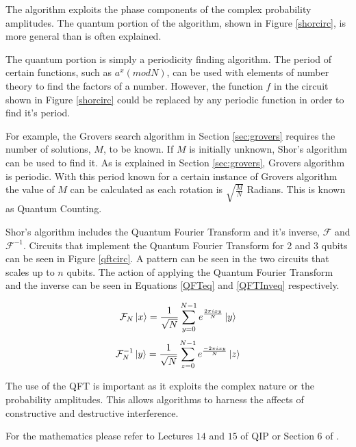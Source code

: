 The algorithm exploits the phase components of the complex probability amplitudes.
The quantum portion of the algorithm, shown in Figure \ref{shorcirc}, is more general than is often explained.

The quantum portion is simply a periodicity finding algorithm.
The period of certain functions, such as $a^x(mod N)$, can be used with elements of number theory to find the factors of a number.
However, the function $f$ in the circuit shown in Figure \ref{shorcirc} could be replaced by any periodic function in order to find it's period.

For example, the Grovers search algorithm in Section \ref{sec:grovers} requires the number of solutions, $M$, to be known.
If $M$ is initially unknown, Shor's algorithm can be used to find it.
As is explained in Section \ref{sec:grovers}, Grovers algorithm is periodic.
With this period known for a certain instance of Grovers algorithm the value of $M$ can be calculated as each rotation is $\sqrt{\frac{M}{N}}$ Radians.
This is known as Quantum Counting\cite{Brassard:1998vj}.

Shor's algorithm includes the Quantum Fourier Transform and it's inverse, $\mathcal{F}$ and $\mathcal{F}^{-1}$.
Circuits that implement the Quantum Fourier Transform for 2 and 3 qubits can be seen in Figure \ref{qftcirc}.
A pattern can be seen in the two circuits that scales up to $n$ qubits.
The action of applying the Quantum Fourier Transform and the inverse can be seen in Equations \ref{QFTeq} and \ref{QFTInveq} respectively.

\begin{equation}
 \mathcal{F}_N\left\vert{x}\right\rangle=\frac{1}{\sqrt{N}}\sum_{y=0}^{N-1}e^{\frac{2\pi{i}xy}{N}}\left\vert{y}\right\rangle
\label{QFTeq}
\end{equation}
\begin{equation}
 \mathcal{F}^{-1}_N\left\vert{y}\right\rangle=\frac{1}{\sqrt{N}}\sum_{z=0}^{N-1}e^{\frac{-2\pi{i}xy}{N}}\left\vert{z}\right\rangle
\label{QFTInveq}
\end{equation}

The use of the QFT is important as it exploits the complex nature or the probability amplitudes.
This allows algorithms to harness the affects of constructive and destructive interference.

For the mathematics please refer to Lectures $14$ and $15$ of QIP\cite{QIPLect} or Section 6 of \cite{2000:IQC:367701.367709}.

